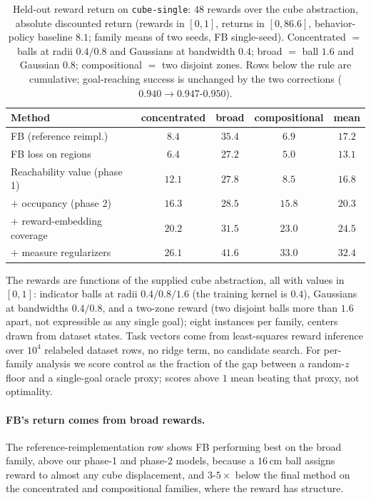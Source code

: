 \documentclass{article}
\begin{document}
\begin{table}[t]
\centering\small
\begin{tabular}{l cccc}
\toprule
Method & concentrated & broad & compositional & mean \\
\midrule
FB (reference reimpl.)  & $8.4$ & $35.4$ & $6.9$ & $17.2$ \\
FB loss on regions      & $6.4$ & $27.2$ & $5.0$ & $13.1$ \\
\midrule
Reachability value (phase 1) & $12.1$ & $27.8$ & $8.5$  & $16.8$ \\
$+$ occupancy (phase 2)      & $16.3$ & $28.5$ & $15.8$ & $20.3$ \\
$+$ reward-embedding coverage & $20.2$ & $31.5$ & $23.0$ & $24.5$ \\
$+$ measure regularizers & $\mathbf{26.1}$ & $\mathbf{41.6}$ & $\mathbf{33.0}$ & $\mathbf{32.4}$ \\
\bottomrule
\end{tabular}
\caption{Held-out reward return on \texttt{cube-single}: $48$ rewards over the cube abstraction, absolute discounted return (rewards in $[0,1]$, returns in $[0,86.6]$, behavior-policy baseline $8.1$; family means of two seeds, FB single-seed).
Concentrated $=$ balls at radii $0.4/0.8$ and Gaussians at bandwidth $0.4$; broad $=$ ball $1.6$ and Gaussian $0.8$; compositional $=$ two disjoint zones.
Rows below the rule are cumulative; goal-reaching success is unchanged by the two corrections ($0.940\to0.947$-$0.950$).}
\label{tab:transfer}
\end{table}

The rewards are functions of the supplied cube abstraction, all with values in $[0,1]$: indicator balls at radii $0.4/0.8/1.6$ (the training kernel is $0.4$), Gaussians at bandwidths $0.4/0.8$, and a two-zone reward (two disjoint balls more than $1.6$ apart, not expressible as any single goal); eight instances per family, centers drawn from dataset states.
Task vectors come from least-squares reward inference over $10^4$ relabeled dataset rows, no ridge term, no candidate search.
For per-family analysis we score control as the fraction of the gap between a random-$z$ floor and a single-goal oracle proxy; scores above $1$ mean beating that proxy, not optimality.

\paragraph{FB's return comes from broad rewards.}
The reference-reimplementation row shows FB performing best on the broad family, above our phase-1 and phase-2 models, because a $16$\,cm ball assigns reward to almost any cube displacement, and $3$-$5\times$ below the final method on the concentrated and compositional families, where the reward has structure.
\end{document}
